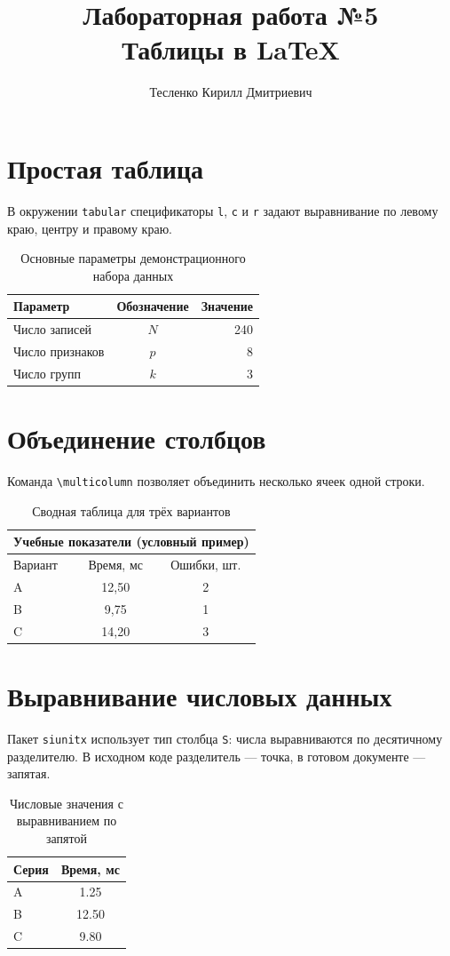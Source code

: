 \documentclass[a4paper,12pt]{article}
\title{Лабораторная работа №5\\Таблицы в LaTeX}
\author{Тесленко Кирилл Дмитриевич}
\date{}
\begin{document}
\maketitle
\section{Простая таблица}
В окружении \texttt{tabular} спецификаторы \texttt{l}, \texttt{c} и \texttt{r}
задают выравнивание по левому краю, центру и правому краю.
\begin{table}[htbp]
\centering
\caption{Основные параметры демонстрационного набора данных}
\label{tab:parameters}
\begin{tabular}{@{}lcr@{}}
\toprule
Параметр & Обозначение & Значение\\
\midrule
Число записей & $N$ & 240\\
Число признаков & $p$ & 8\\
Число групп & $k$ & 3\\
\bottomrule
\end{tabular}
\end{table}
\section{Объединение столбцов}
Команда \verb|\multicolumn| позволяет объединить несколько ячеек одной строки.
\begin{table}[htbp]
\centering
\caption{Сводная таблица для трёх вариантов}
\label{tab:summary}
\begin{tabular}{@{}lcc@{}}
\toprule
\multicolumn{3}{c}{Учебные показатели (условный пример)}\\
\midrule
Вариант & Время, мс & Ошибки, шт.\\
\midrule
A & 12,50 & 2\\
B & 9,75 & 1\\
C & 14,20 & 3\\
\bottomrule
\end{tabular}
\end{table}
\section{Выравнивание числовых данных}
Пакет \texttt{siunitx} использует тип столбца \texttt{S}: числа
выравниваются по десятичному разделителю. В исходном коде
разделитель --- точка, в готовом документе --- запятая.
\begin{table}[htbp]
\centering
\caption{Числовые значения с выравниванием по запятой}
\label{tab:numbers}
\begin{tabular}{@{}l S[table-format=2.2]@{}}
\toprule
Серия & {Время, мс}\\
\midrule
A & 1.25\\
B & 12.50\\
C & 9.80\\
\bottomrule
\end{tabular}
\end{table}
\end{document}
